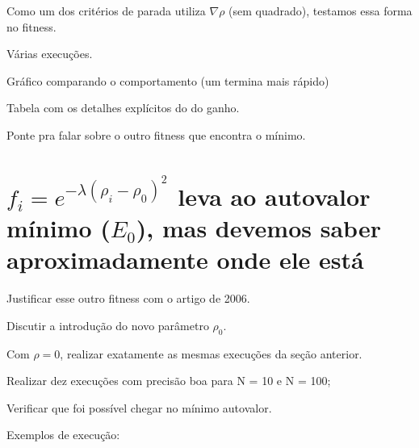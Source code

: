 	Como um dos critérios de parada utiliza $\nabla \rho$ (sem quadrado), testamos essa forma no fitness.
	
	Várias execuções.
	
	Gráfico comparando o comportamento (um termina mais rápido)
	
	Tabela com os detalhes explícitos do do ganho.
	
	Ponte pra falar sobre o outro fitness que encontra o mínimo.
	
	\section{$f_i = e^{-\lambda(\rho_i - \rho_0)^2}$ leva ao autovalor mínimo ($E_0$), mas devemos saber aproximadamente onde ele está}
	
	Justificar esse outro fitness com o artigo de 2006.
	
	Discutir a introdução do novo parâmetro $\rho_0$.
	
	Com $\rho = 0$, realizar exatamente as mesmas execuções da seção anterior.
	
	Realizar dez execuções com precisão boa para N = 10 e N = 100;
	
	Verificar que foi possível chegar no mínimo autovalor.
	
	Exemplos de execução:
	
